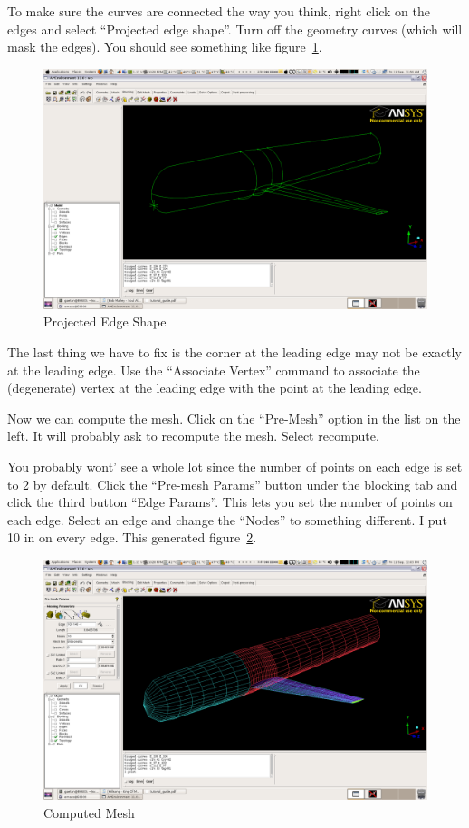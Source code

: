 \documentclass{report}
\begin{document}
To make sure the curves are connected the way you think, right click on the edges and select ``Projected edge shape''. Turn off the geometry  curves (which will mask the edges). You should see something like figure~\ref{fig:projected_edge_shape}.
\begin{figure}[htb]
  \centering
  \includegraphics[width=\textwidth,angle=0]{figures/fig15.png}
  \caption{Projected Edge Shape}
  \label{fig:projected_edge_shape}
\end{figure}

The last thing we have to fix is the corner at the leading edge may not be exactly at the leading edge. Use the ``Associate Vertex'' command to associate the (degenerate) vertex at the leading edge with the point at the leading edge.

Now we can compute the mesh. Click on the ``Pre-Mesh'' option in the list on the left. It will probably ask to recompute the mesh. Select recompute. 

You probably wont' see a whole lot since the number of points on each edge is set to 2 by default. Click the ``Pre-mesh Params'' button under the blocking tab and click the third button ``Edge Params''. This lets you set the number of points on each edge. Select an edge and change the ``Nodes'' to something different. I put 10 in on every edge. This generated figure~\ref{fig:pre_mesh}.

\begin{figure}[htb]
  \centering
  \includegraphics[width=\textwidth,angle=0]{figures/fig16.png}
  \caption{Computed Mesh}
  \label{fig:pre_mesh}
\end{figure}
\end{document}
